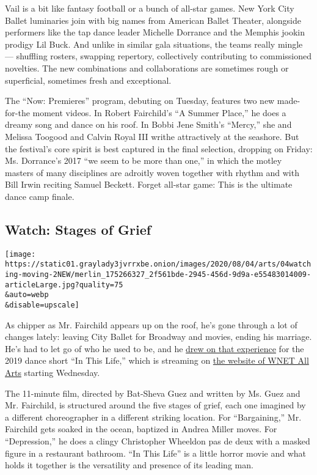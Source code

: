 Vail is a bit like fantasy football or a bunch of all-star games. New
York City Ballet luminaries join with big names from American Ballet
Theater, alongside performers like the tap dance leader Michelle
Dorrance and the Memphis jookin prodigy Lil Buck. And unlike in similar
gala situations, the teams really mingle --- shuffling rosters, swapping
repertory, collectively contributing to commissioned novelties. The new
combinations and collaborations are sometimes rough or superficial,
sometimes fresh and exceptional.

The ``Now: Premieres'' program, debuting on Tuesday, features two new
made-for-the moment videos. In Robert Fairchild's ``A Summer Place,'' he
does a dreamy song and dance on his roof. In Bobbi Jene Smith's
``Mercy,'' she and Melissa Toogood and Calvin Royal III writhe
attractively at the seashore. But the festival's core spirit is best
captured in the final selection, dropping on Friday: Ms. Dorrance's 2017
``we seem to be more than one,'' in which the motley masters of many
disciplines are adroitly woven together with rhythm and with Bill Irwin
reciting Samuel Beckett. Forget all-star game: This is the ultimate
dance camp finale.

\hypertarget{watch-stages-of-grief}{%
\subsection{Watch: Stages of Grief}\label{watch-stages-of-grief}}

\texttt{[image: https://static01.graylady3jvrrxbe.onion/images/2020/08/04/arts/04watching-moving-2NEW/merlin\_175266327\_2f561bde-2945-456d-9d9a-e55483014009-articleLarge.jpg?quality=75\\\&auto=webp\\\&disable=upscale]}

As chipper as Mr. Fairchild appears up on the roof, he's gone through a
lot of changes lately: leaving City Ballet for Broadway and movies,
ending his marriage. He's had to let go of who he used to be, and he
\href{https://www.dancemagazine.com/robbie-fairchild-short-film-2639173287.html?rebelltitem=5\#rebelltitem5}{drew
on that experience} for the 2019 dance short ``In This Life,'' which is
streaming on
\href{https://allarts.org/programs/all-arts-performance-selects/life-fvtylu/}{the
website of WNET All Arts} starting Wednesday.

The 11-minute film, directed by Bat-Sheva Guez and written by Ms. Guez
and Mr. Fairchild, is structured around the five stages of grief, each
one imagined by a different choreographer in a different striking
location. For ``Bargaining,'' Mr. Fairchild gets soaked in the ocean,
baptized in Andrea Miller moves. For ``Depression,'' he does a clingy
Christopher Wheeldon pas de deux with a masked figure in a restaurant
bathroom. ``In This Life'' is a little horror movie and what holds it
together is the versatility and presence of its leading man.

